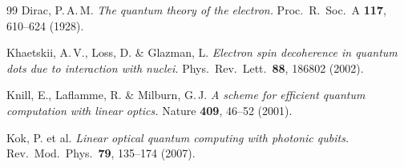 \begin{thebibliography}{99}
Dirac, P.\,A.\,M.
\textit{The quantum theory of the electron.}
Proc.\ R.\ Soc.\ A \textbf{117}, 610--624 (1928).

Khaetskii, A.\,V., Loss, D. \& Glazman, L.
\textit{Electron spin decoherence in quantum dots due to interaction with
nuclei.}
Phys.\ Rev.\ Lett.\ \textbf{88}, 186802 (2002).

Knill, E., Laflamme, R. \& Milburn, G.\,J.
\textit{A scheme for efficient quantum computation with linear optics.}
Nature \textbf{409}, 46--52 (2001).

Kok, P. et al.
\textit{Linear optical quantum computing with photonic qubits.}
Rev.\ Mod.\ Phys.\ \textbf{79}, 135--174 (2007).

\end{thebibliography}
